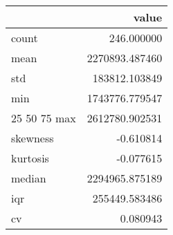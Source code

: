 \begin{tabular}{lr}
\toprule
 & value \\
\midrule
count & 246.000000 \\
mean & 2270893.487460 \\
std & 183812.103849 \\
min & 1743776.779547 \\
25%
50%
75%
max & 2612780.902531 \\
skewness & -0.610814 \\
kurtosis & -0.077615 \\
median & 2294965.875189 \\
iqr & 255449.583486 \\
cv & 0.080943 \\
\bottomrule
\end{tabular}
